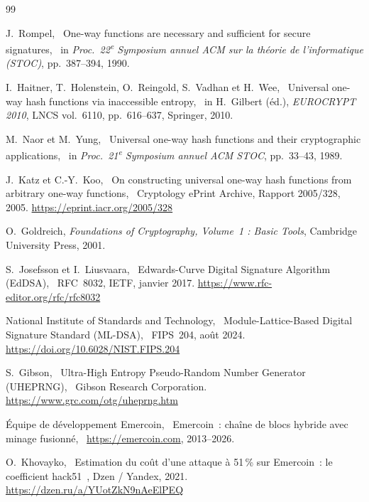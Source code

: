 \documentclass[11pt,a4paper]{article}
\begin{document}
\begin{thebibliography}{99}

  J.~Rompel,
  \og~One-way functions are necessary and sufficient for secure signatures,~\fg
  in \textit{Proc.\ 22\textsuperscript{e} Symposium annuel ACM sur la théorie
  de l'informatique (STOC)}, pp.~387--394, 1990.

  I.~Haitner, T.~Holenstein, O.~Reingold, S.~Vadhan et H.~Wee,
  \og~Universal one-way hash functions via inaccessible entropy,~\fg
  in H.~Gilbert (éd.), \textit{EUROCRYPT 2010},
  LNCS vol.~6110, pp.~616--637, Springer, 2010.

  M.~Naor et M.~Yung,
  \og~Universal one-way hash functions and their cryptographic applications,~\fg
  in \textit{Proc.\ 21\textsuperscript{e} Symposium annuel ACM STOC},
  pp.~33--43, 1989.

  J.~Katz et C.-Y.~Koo,
  \og~On constructing universal one-way hash functions from arbitrary one-way
  functions,~\fg
  Cryptology ePrint Archive, Rapport 2005/328, 2005.
  \url{https://eprint.iacr.org/2005/328}

  O.~Goldreich,
  \textit{Foundations of Cryptography, Volume~1 : Basic Tools},
  Cambridge University Press, 2001.

  S.~Josefsson et I.~Liusvaara,
  \og~Edwards-Curve Digital Signature Algorithm (EdDSA),~\fg
  RFC~8032, IETF, janvier 2017.
  \url{https://www.rfc-editor.org/rfc/rfc8032}

  National Institute of Standards and Technology,
  \og~Module-Lattice-Based Digital Signature Standard (ML-DSA),~\fg
  FIPS~204, août 2024.
  \url{https://doi.org/10.6028/NIST.FIPS.204}

  S.~Gibson,
  \og~Ultra-High Entropy Pseudo-Random Number Generator (UHEPRNG),~\fg
  Gibson Research Corporation.
  \url{https://www.grc.com/otg/uheprng.htm}

  Équipe de développement Emercoin,
  \og~Emercoin~: chaîne de blocs hybride avec minage fusionné,~\fg
  \url{https://emercoin.com}, 2013--2026.

  O.~Khovayko,
  \og~Estimation du coût d'une attaque à 51\,\% sur Emercoin~: le coefficient
  hack51~\fg [en russe],
  Dzen / Yandex, 2021.
  \url{https://dzen.ru/a/YUotZkN9nAeElPEQ}


\end{thebibliography}
\end{document}

